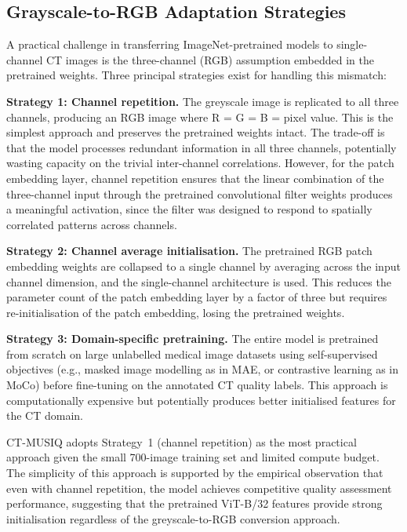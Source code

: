\subsection{Grayscale-to-RGB Adaptation Strategies}

A practical challenge in transferring ImageNet-pretrained models to single-channel CT
images is the three-channel (RGB) assumption embedded in the pretrained weights. Three
principal strategies exist for handling this mismatch:

\textbf{Strategy 1: Channel repetition.} The greyscale image is replicated to all three
channels, producing an RGB image where R = G = B = pixel value. This is the simplest
approach and preserves the pretrained weights intact. The trade-off is that the model
processes redundant information in all three channels, potentially wasting capacity on
the trivial inter-channel correlations. However, for the patch embedding layer, channel
repetition ensures that the linear combination of the three-channel input through the
pretrained convolutional filter weights produces a meaningful activation, since the filter
was designed to respond to spatially correlated patterns across channels.

\textbf{Strategy 2: Channel average initialisation.} The pretrained RGB patch embedding
weights are collapsed to a single channel by averaging across the input channel dimension,
and the single-channel architecture is used. This reduces the parameter count of the
patch embedding layer by a factor of three but requires re-initialisation of the patch
embedding, losing the pretrained weights.

\textbf{Strategy 3: Domain-specific pretraining.} The entire model is pretrained from
scratch on large unlabelled medical image datasets using self-supervised objectives
(e.g., masked image modelling as in MAE, or contrastive learning as in MoCo) before
fine-tuning on the annotated CT quality labels. This approach is computationally expensive
but potentially produces better initialised features for the CT domain.

CT-MUSIQ adopts Strategy~1 (channel repetition) as the most practical approach given the
small 700-image training set and limited compute budget. The simplicity of this approach
is supported by the empirical observation that even with channel repetition, the model
achieves competitive quality assessment performance, suggesting that the pretrained
ViT-B/32 features provide strong initialisation regardless of the greyscale-to-RGB
conversion approach.

